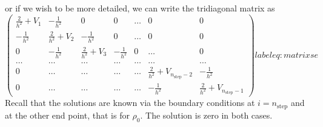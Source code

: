 or if we wish to be more detailed, we can write the tridiagonal matrix as
\begin{equation}
    \left( \begin{array}{ccccccc} \frac{2}{h^2}+V_1 & -\frac{1}{h^2} & 0   & 0    & \dots  &0     & 0 \\
                                -\frac{1}{h^2} & \frac{2}{h^2}+V_2 & -\frac{1}{h^2} & 0    & \dots  &0     &0 \\
                                0   & -\frac{1}{h^2} & \frac{2}{h^2}+V_3 & -\frac{1}{h^2}  &0       &\dots & 0\\
                                \dots  & \dots & \dots & \dots  &\dots      &\dots & \dots\\
                                0   & \dots & \dots & \dots  &\dots       &\frac{2}{h^2}+V_{n_{\mathrm{step}}-2} & -\frac{1}{h^2}\\
                                0   & \dots & \dots & \dots  &\dots       &-\frac{1}{h^2} & \frac{2}{h^2}+V_{n_{\mathrm{step}}-1}

             \end{array} \right)
label{eq:matrixse}
\end{equation}
Recall that the solutions are known via the boundary conditions at
$i=n_{\mathrm{step}}$ and at the other end point, that is for  $\rho_0$.
The solution is zero in both cases.

